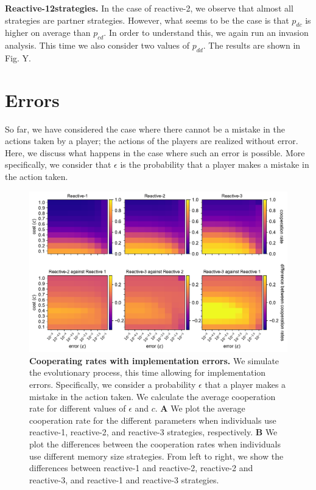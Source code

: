 \documentclass[11pt]{article}
\theoremstyle{plainCl1}
\theoremstyle{plainCl2}
\begin{document}
\noindent
\textbf{Reactive-12strategies.} In the case of reactive-2, we observe that almost all
strategies are partner strategies. However, what seems to be the case is that \(
p_{dc} \) is higher on average than \( p_{cd} \). In order to understand this,
we again run an invasion analysis. This time we also consider two values of \(
p_{dd} \). The results are shown in Fig. Y. \\



\section{Errors}

So far, we have considered the case where there cannot be a mistake in the
actions taken by a player; the actions of the players are realized without
error. Here, we discuss what happens in the case where such an error is
possible. More specifically, we consider that \(\epsilon\) is the probability
that a player makes a mistake in the action taken.

\begin{figure}[t]
    \centering
    \includegraphics[width=\textwidth]{../../figures/siFig2Errors.pdf}
    \caption{
    \textbf{Cooperating rates with implementation errors.}
We simulate the evolutionary process, this time allowing for implementation
errors. Specifically, we consider a probability \(\epsilon\) that a player makes a mistake
in the action taken. We calculate the average cooperation rate for different
values of \(\epsilon\) and \(c\).
{\bf A} We plot the average cooperation rate for the different parameters when
individuals use reactive-1, reactive-2, and reactive-3 strategies, respectively.
{\bf B} We plot the differences between the cooperation rates when individuals use
different memory size strategies. From left to right, we show the differences
between reactive-1 and reactive-2, reactive-2 and reactive-3, and reactive-1 and
reactive-3 strategies.
    }\label{fig:errors}
\end{figure}
\end{document}
